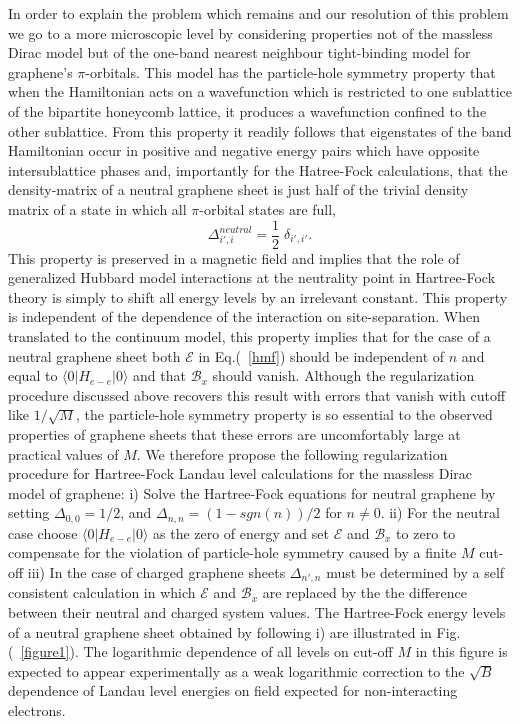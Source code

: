 \documentclass{ws-ijmpb}
\begin{document}
In order to explain the problem which remains and our resolution of this problem 
we go to a more microscopic level by considering properties not of the
massless Dirac model but of the one-band nearest neighbour tight-binding model
for graphene's $\pi$-orbitals.  This model has the particle-hole symmetry property that when the Hamiltonian acts on a 
wavefunction which is restricted to one sublattice of the bipartite
honeycomb lattice, it produces a wavefunction confined to the other sublattice.
From this property it readily follows that eigenstates of the band 
Hamiltonian occur in positive and negative energy pairs which have 
opposite intersublattice phases and, importantly for the Hatree-Fock 
calculations, that the density-matrix of a neutral graphene sheet is just half
of the trivial density matrix of a state in which all $\pi$-orbital states 
are full,
\begin{equation}
\Delta_{i',i}^{neutral} = \frac{1}{2} \; \delta_{i',i'} .
\end{equation} 
This property is preserved in a magnetic field and implies that the role of generalized Hubbard model interactions
at the neutrality point in Hartree-Fock theory is simply to shift all energy levels by an irrelevant constant.
This property is independent of the dependence of the interaction on site-separation.  
When translated to the continuum model, this property implies that 
for the case of a neutral graphene sheet both $\mathcal{E}$ in Eq.(~\ref{hmf}) should be independent of 
$n$ and equal to $\langle 0 | H_{e-e} | 0\rangle$ and that $\mathcal{B}_{x}$ should vanish.
Although the regularization procedure discussed above recovers this 
result with errors that vanish with 
cutoff like $1/\sqrt{M}$, the particle-hole symmetry property is so essential 
to the observed properties of graphene sheets that these errors are 
uncomfortably large at practical values of $M$.  We therefore propose the following 
regularization procedure for Hartree-Fock Landau level calculations for the massless 
Dirac model of graphene: i) Solve the Hartree-Fock equations for neutral graphene 
by setting $\Delta_{0,0}=1/2$, and $\Delta_{n,n}=(1-sgn(n))/2$ for $n \ne 0$.
ii) For the neutral case choose $\langle 0 | H_{e-e} | 0\rangle$ as the zero of energy 
and set $\mathcal{E}$ and $\mathcal{B}_{x}$ to zero to compensate for the
violation of particle-hole symmetry caused by a finite $M$ cut-off iii) In the case of 
charged graphene sheets $\Delta_{n',n}$ must be determined by a self consistent 
calculation in which $\mathcal{E}$ and $\mathcal{B}_{x}$ are replaced by
the the difference between their neutral and charged system values.
The Hartree-Fock energy levels of a neutral graphene sheet obtained 
by following i) are illustrated in Fig.(~\ref{figure1}).  The logarithmic 
dependence of all levels on cut-off $M$ in this figure is expected to 
appear experimentally as a weak logarithmic correction to the $\sqrt{B}$ 
dependence of Landau level energies on field expected for non-interacting electrons.  
\end{document}
